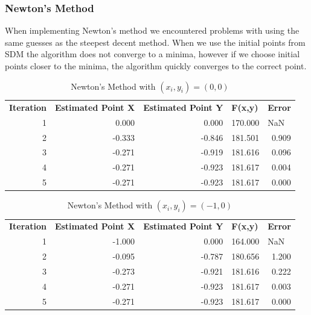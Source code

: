 \documentclass[12pt]{article}
\begin{document}
\subsubsection{Newton's Method}
When implementing Newton's method we encountered problems with using the same guesses as the steepest decent method. When we use the initial points from SDM the algorithm does not converge to a minima, however if we choose initial points closer to the minima, the algorithm quickly converges to the correct point.
\begin{table}[h!]
  \centering
  \caption{Newton's Method with $(x_i,y_i) = (0,0)$}
    \begin{tabular}{rrrrr}
    \multicolumn{1}{l}{\textbf{Iteration }} & \multicolumn{1}{l}{\textbf{Estimated Point X}} & \multicolumn{1}{l}{\textbf{Estimated Point Y}} & \multicolumn{1}{l}{\textbf{F(x,y)}} & \multicolumn{1}{l}{\textbf{Error}} \\
    1     & 0.000 & 0.000 & 170.000 & \multicolumn{1}{l}{NaN} \\
    2     & -0.333 & -0.846 & 181.501 & 0.909 \\
    3     & -0.271 & -0.919 & 181.616 & 0.096 \\
    4     & -0.271 & -0.923 & 181.617 & 0.004 \\
    5     & -0.271 & -0.923 & 181.617 & 0.000 \\
    \end{tabular}%
\end{table}%
\begin{table}[h!]
  \centering
  \caption{Newton's Method with $(x_i,y_i) = (-1,0)$}
    \begin{tabular}{rrrrr}
    \multicolumn{1}{l}{\textbf{Iteration }} & \multicolumn{1}{l}{\textbf{Estimated Point X}} & \multicolumn{1}{l}{\textbf{Estimated Point Y}} & \multicolumn{1}{l}{\textbf{F(x,y)}} & \multicolumn{1}{l}{\textbf{Error}} \\
    1     & -1.000 & 0.000 & 164.000 & \multicolumn{1}{l}{NaN} \\
    2     & -0.095 & -0.787 & 180.656 & 1.200 \\
    3     & -0.273 & -0.921 & 181.616 & 0.222 \\
    4     & -0.271 & -0.923 & 181.617 & 0.003 \\
    5     & -0.271 & -0.923 & 181.617 & 0.000 \\
    \end{tabular}%
\end{table}%
\end{document}
